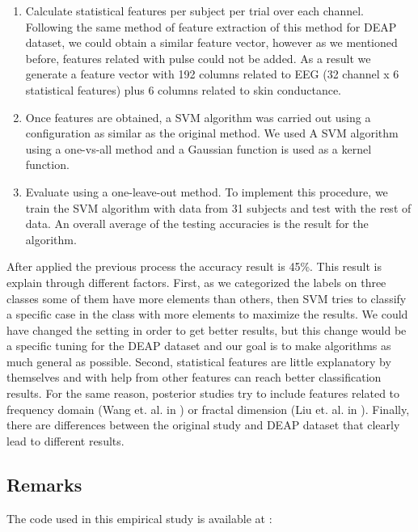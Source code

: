 \documentclass{sig-alternate}
\begin{document}
\begin{enumerate}

\item Calculate statistical features per subject per trial over each channel. 
Following the same method of feature extraction of this method for DEAP dataset, 
we could obtain a similar feature vector, however as we mentioned before, 
features related with pulse could not be added. As a result we generate 
a feature vector with 192 columns related to EEG (32 channel x 6 statistical 
features) plus 6 columns related to skin conductance.

\item Once features are obtained, a SVM algorithm was carried out using a configuration 
as similar as the original method. We used A SVM algorithm using a
one-vs-all method and a Gaussian function is used as a kernel function. 

\item Evaluate using a one-leave-out method. To implement this procedure, we train 
the SVM algorithm with data from 31 subjects and test with the rest of data.
An overall average of the testing accuracies is the result for the algorithm.

\end{enumerate}
 
After applied the previous process the accuracy result is 45\%. This result is explain 
through different factors. First, as we categorized the labels on three classes some of them
have more elements than others, then SVM tries to classify a specific case in 
the class with more elements to maximize the results. We could have changed the setting in order to get 
better results, but this change would be a specific tuning for the DEAP dataset and 
our goal is to make algorithms as much general as possible. Second, statistical features 
are little explanatory by themselves and with help from other features can reach
better classification results. For the same reason, posterior studies try to include 
features related to frequency domain (Wang et. al. in \cite{wang2011}) or fractal dimension
(Liu et. al. in \cite{liu2013}). Finally, there are differences between the original study
and DEAP dataset that clearly lead to different results.

\subsection{Remarks}

The code used in this empirical study is available at : 
\end{document}
